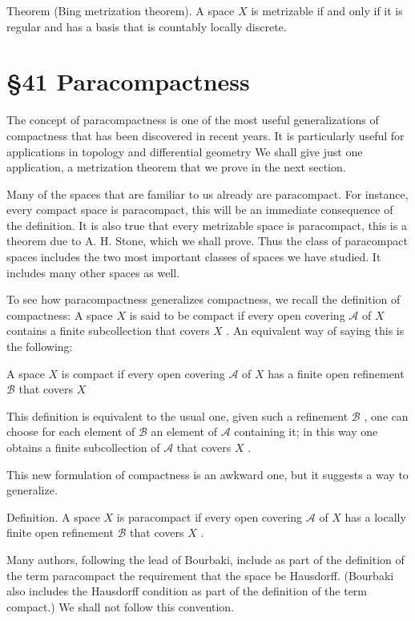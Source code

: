 Theorem (Bing metrization theorem). A space \(X\) is metrizable if and only if it is regular and has a basis that is countably locally discrete.

\section*{§41 Paracompactness}

The concept of paracompactness is one of the most useful generalizations of compactness that has been discovered in recent years. It is particularly useful for applications in topology and differential geometry We shall give just one application, a metrization theorem that we prove in the next section.

Many of the spaces that are familiar to us already are paracompact. For instance, every compact space is paracompact, this will be an immediate consequence of the definition. It is also true that every metrizable space is paracompact, this is a theorem due to A. H. Stone, which we shall prove. Thus the class of paracompact spaces includes the two most important classes of spaces we have studied. It includes many other spaces as well.

To see how paracompactness generalizes compactness, we recall the definition of compactness: A space \(X\) is said to be compact if every open covering \(\mathcal{A}\) of \(X\) contains a finite subcollection that covers \(X\) . An equivalent way of saying this is the following:

A space \(X\) is compact if every open covering \(\mathcal{A}\) of \(X\) has a finite open refinement \(\mathcal{B}\) that covers \(X\)

This definition is equivalent to the usual one, given such a refinement \(\mathcal{B}\) , one can choose for each element of \(\mathcal{B}\) an element of \(\mathcal{A}\) containing it; in this way one obtains a finite subcollection of \(\mathcal{A}\) that covers \(X\) .

This new formulation of compactness is an awkward one, but it suggests a way to generalize.

Definition. A space \(X\) is paracompact if every open covering \(\mathcal{A}\) of \(X\) has a locally finite open refinement \(\mathcal{B}\) that covers \(X\) .

Many authors, following the lead of Bourbaki, include as part of the definition of the term paracompact the requirement that the space be Hausdorff. (Bourbaki also includes the Hausdorff condition as part of the definition of the term compact.) We shall not follow this convention.

